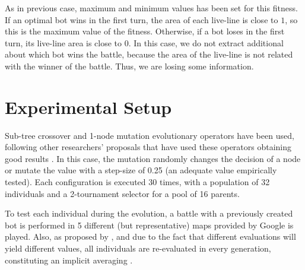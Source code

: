 \documentclass[preprint]{elsarticle}
\begin{document}
As in previous case, maximum and minimum values has been set for this fitness. If an optimal bot wins in the first turn, the area of each live-line is close to {$1$}, so this is the maximum value of the fitness. Otherwise, if a bot loses in the first turn, its live-line area is close to {$0$}. In this case, we do not extract additional about which bot wins the battle, because the area of the live-line is not related with the winner of the battle. Thus, we are losing some information. 


\section{Experimental Setup}
\label{sec:experiments}

Sub-tree crossover and 1-node mutation evolutionary operators have
been used, following other researchers' proposals that have used these
operators obtaining good results \cite{Esparcia2013GPunreal}. In this
case, the mutation randomly changes the decision of a node or mutate
the value with a step-size of 0.25 (an adequate value empirically
tested). Each configuration is executed 30 times, with a population of
32 individuals and a 2-tournament selector for a pool of 16
parents.


To test each individual during the evolution, a battle with a previously created bot is performed in 5 different (but representative) maps provided by Google is played. 
Also, as proposed by \cite{Genebot_CEC11}, and due to the fact that
different evaluations will yield different values, all individuals are
re-evaluated in every generation, constituting an implicit averaging
 \cite{Jin2005303,DBLP:conf/ijcci/MereloLFGCCRMG15}.
\end{document}
